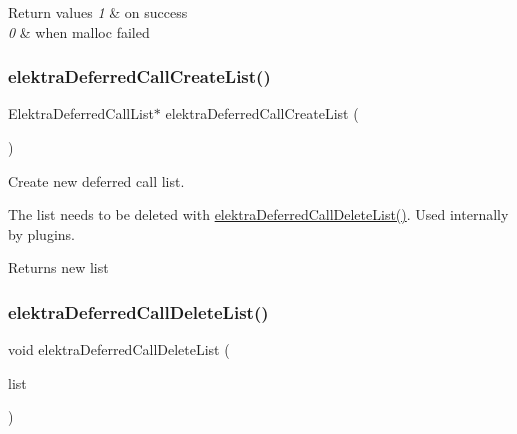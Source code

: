 \begin{DoxyRetVals}{Return values}
{\em 1} & on success \\
\hline
{\em 0} & when malloc failed \\
\hline
\end{DoxyRetVals}
\mbox{\label{group__invoke_gacff96e795f6fc2fad61ed2f8a5cd80cb}} 
\subsubsection{\texorpdfstring{elektra\+Deferred\+Call\+Create\+List()}{elektraDeferredCallCreateList()}}
{\footnotesize\ttfamily Elektra\+Deferred\+Call\+List$\ast$ elektra\+Deferred\+Call\+Create\+List (\begin{DoxyParamCaption}\item[{void}]{ }\end{DoxyParamCaption})}



Create new deferred call list. 

The list needs to be deleted with \hyperlink{group__invoke_ga7b9d8b37ebd5205fded885164d3ad6b7}{elektra\+Deferred\+Call\+Delete\+List()}. Used internally by plugins.

\begin{DoxyReturn}{Returns}
new list 
\end{DoxyReturn}
\mbox{\label{group__invoke_ga7b9d8b37ebd5205fded885164d3ad6b7}} 
\subsubsection{\texorpdfstring{elektra\+Deferred\+Call\+Delete\+List()}{elektraDeferredCallDeleteList()}}
{\footnotesize\ttfamily void elektra\+Deferred\+Call\+Delete\+List (\begin{DoxyParamCaption}\item[{Elektra\+Deferred\+Call\+List $\ast$}]{list }\end{DoxyParamCaption})}



